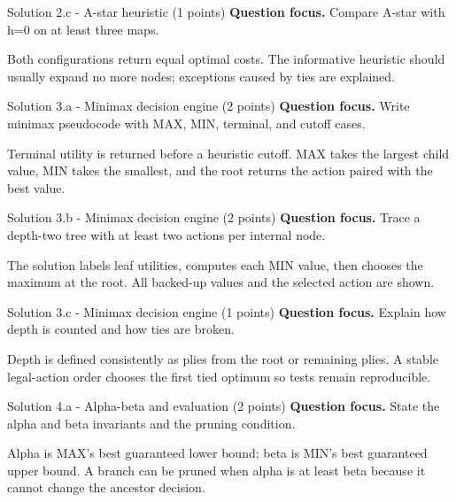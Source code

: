 \documentclass[aspectratio=169,11pt]{beamer}
\begin{document}
\begin{frame}{Solution 2.c - A-star heuristic (1 points)}
\small
\textbf{Question focus.} Compare A-star with h=0 on at least three maps.

\vspace{0.25cm}
\answerlabel Both configurations return equal optimal costs. The informative heuristic should usually expand no more nodes; exceptions caused by ties are explained.
\end{frame}

\begin{frame}{Solution 3.a - Minimax decision engine (2 points)}
\small
\textbf{Question focus.} Write minimax pseudocode with MAX, MIN, terminal, and cutoff cases.

\vspace{0.25cm}
\answerlabel Terminal utility is returned before a heuristic cutoff. MAX takes the largest child value, MIN takes the smallest, and the root returns the action paired with the best value.
\end{frame}

\begin{frame}{Solution 3.b - Minimax decision engine (2 points)}
\small
\textbf{Question focus.} Trace a depth-two tree with at least two actions per internal node.

\vspace{0.25cm}
\answerlabel The solution labels leaf utilities, computes each MIN value, then chooses the maximum at the root. All backed-up values and the selected action are shown.
\end{frame}

\begin{frame}{Solution 3.c - Minimax decision engine (1 points)}
\small
\textbf{Question focus.} Explain how depth is counted and how ties are broken.

\vspace{0.25cm}
\answerlabel Depth is defined consistently as plies from the root or remaining plies. A stable legal-action order chooses the first tied optimum so tests remain reproducible.
\end{frame}

\begin{frame}{Solution 4.a - Alpha-beta and evaluation (2 points)}
\small
\textbf{Question focus.} State the alpha and beta invariants and the pruning condition.

\vspace{0.25cm}
\answerlabel Alpha is MAX's best guaranteed lower bound; beta is MIN's best guaranteed upper bound. A branch can be pruned when alpha is at least beta because it cannot change the ancestor decision.
\end{frame}
\end{document}
